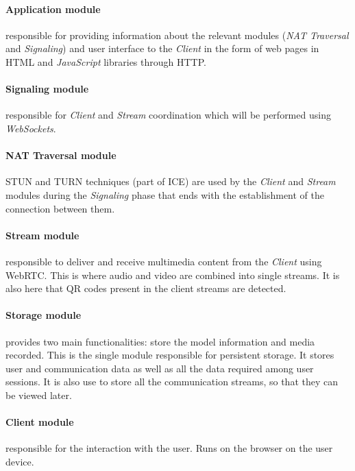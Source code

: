 \documentclass[10pt,conference]{IEEEtran}
\begin{document}
\paragraph{Application module} responsible for providing information about the relevant modules (\emph{NAT Traversal} and \emph{Signaling}) and user interface to the \emph{Client} in the form of web pages in \gls{HTML} and \emph{JavaScript} libraries through \gls{HTTP}.
 
\paragraph{Signaling module} responsible for \emph{Client} and \emph{Stream} coordination which will be performed using \emph{WebSockets}.

\paragraph{NAT Traversal module} \gls{STUN} and \gls{TURN} techniques (part of \gls{ICE}) are used by the \emph{Client} and \emph{Stream} modules during the \emph{Signaling} phase that ends with the establishment of the connection between them.

\paragraph{Stream module} responsible to deliver and receive multimedia content from the \emph{Client} using \gls{WebRTC}. This is where audio and video are combined into single streams. It is also here that \gls{QR} codes present in the client streams are detected.

\paragraph{Storage module} provides two main functionalities: store the model information and media recorded. This is the single module responsible for persistent storage. It stores user and communication data as well as all the data required among user sessions. It is also use to store all the communication streams, so that they can be viewed later.

\paragraph{Client module} responsible for the interaction with the user. Runs on the browser on the user device.
\end{document}
